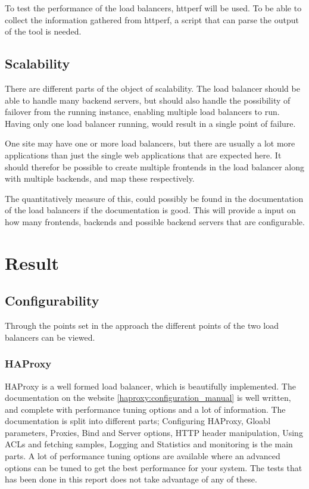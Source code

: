 To test the performance of the load balancers, httperf will be used. To be able
to collect the information gathered from httperf, a script that can parse the
output of the tool is needed.

\subsection{Scalability}
There are different parts of the object of scalability. The load balancer
should be able to handle many backend servers, but should also handle the
possibility of failover from the running instance, enabling multiple load
balancers to run. Having only one load balancer running, would result in a
single point of failure.

One site may have one or more load balancers, but there are usually a lot more
applications than just the single web applications that are expected here. It
should therefor be possible to create multiple frontends in the load balancer
along with multiple backends, and map these respectively.

The quantitatively measure of this, could possibly be found in the
documentation of the load balancers if the documentation is good. This will
provide a input on how many frontends, backends and possible backend servers
that are configurable.


\section{Result}

%
\subsection{Configurability}
Through the points set in the approach the different points of the two load
balancers can be viewed.

\subsubsection{HAProxy}
HAProxy is a well formed load balancer, which is beautifully implemented. The
documentation on the website \ref{haproxy:configuration_manual} is well
written, and complete with performance tuning options and a lot of
information. The documentation is split into different parts; Configuring
HAProxy, Gloabl parameters, Proxies, Bind and Server options, HTTP header
manipulation, Using ACLs and fetching samples, Logging and Statistics and
monitoring is the main parts. A lot of performance tuning options are available
where an advanced options can be tuned to get the best performance for your
system. The tests that has been done in this report does not take advantage of
any of these.

